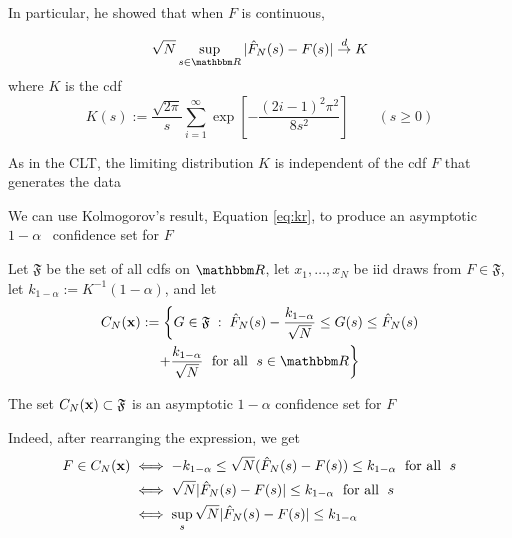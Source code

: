 \begin{frame}

    \vspace{2em}
    In particular, he showed
    that when $F$ is continuous,
    
    \begin{equation}
    \label{eq:kr}
    \sqrt{N} \sup_{s \in \RR} |\hat F_N(s) - F(s)| \tod K
    \end{equation}
    where $K$ is the  {\sc cdf}
    \begin{equation*}
        K(s) := \frac{\sqrt{2 \pi}}{s} \sum_{i=1}^{\infty}
        \exp \left[ - \frac{(2 i - 1)^2 \pi^2}{8 s^2} \right]
        \qquad (s \geq 0)
    \end{equation*}
\end{frame}

\begin{frame}

    \vspace{2em}
    As in the CLT, the limiting distribution $K$ is independent of the
    {\sc cdf} $F$ that generates the data
    
    We can use Kolmogorov's result, Equation \eqref{eq:kr}, to produce an asymptotic $1-\alpha$ \
    confidence set for $F$
    
    \vspace{.7em}
    Let $\mathfrak F$ be the set of all {\sc cdf}s  on $\RR$, let
    $x_1,\ldots,x_N$ be {\sc iid} draws from $F \in \mathfrak F$,
    let $k_{1-\alpha} := K^{-1}(1 - \alpha)$, and let
    \begin{multline*}
        C_N(\boldx) := \bigg\{ G \in \mathfrak F
            \; : \; \hat F_N(s) - \frac{k_{1-\alpha}}{\sqrt{N}} \leq G(s) \leq 
            \hat F_N(s) \\ +  \frac{k_{1-\alpha}}{\sqrt{N}} \; \text{ for all } \; s \in \RR \bigg\}
    \end{multline*}
    
\end{frame}

\begin{frame}

    \vspace{2em}
    The set $C_N({\mathbf x}) \subset \mathfrak F$ is an asymptotic $1-\alpha$
    confidence set for $F$
    
    Indeed, after rearranging the expression, we get
    \begingroup
    \addtolength{\jot}{1em}
    \begin{align*}
        F \in C_N({\mathbf x}) 
        & \iff  - k_{1-\alpha} \leq \sqrt{N}(\hat F_N(s) - F(s)) \leq k_{1-\alpha}
        \; \text{ for all } \; s  \\
        & \iff  \sqrt{N}|\hat F_N(s) - F(s)| \leq k_{1-\alpha}
        \; \text{ for all } \; s  \\
        & \iff  \sup_s \sqrt{N}|\hat F_N(s) - F(s)| \leq k_{1-\alpha} 
    \end{align*}
    \endgroup
    
\end{frame}

